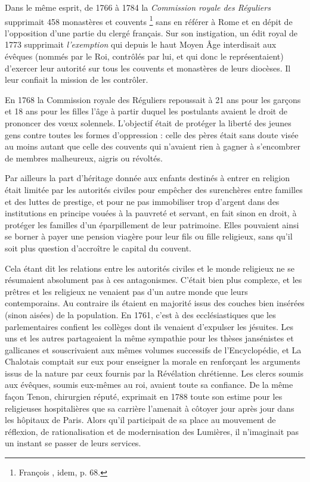  Dans le même esprit, de 1766 à 1784 la \emph{Commission royale des Réguliers} supprimait 458 monastères et couvents%
\footnote{François , idem, p. 68.} 
sans en référer à Rome et en dépit de l'opposition d'une partie du clergé français. Sur son instigation, un édit royal de 1773 supprimait \emph{l'exemption} qui depuis le haut Moyen Âge interdisait aux évêques (nommés par le Roi, contrôlés par lui, et qui donc le représentaient) d'exercer leur autorité sur tous les couvents et monastères de leurs diocèses. Il leur confiait la mission de les contrôler. 

 En 1768 la Commission royale des Réguliers repoussait à 21 ans pour les garçons et 18 ans pour les filles l'âge à partir duquel les postulants avaient le droit de prononcer des vœux solennels. L'objectif était de protéger la liberté des jeunes gens contre toutes les formes d'oppression : celle des pères était sans doute visée au moins autant que celle des couvents qui n'avaient rien à gagner à s'encombrer de membres malheureux, aigris ou révoltés.

 Par ailleurs la part d'héritage donnée aux enfants destinés à entrer en religion était limitée par les autorités civiles pour empêcher des surenchères entre familles et des luttes de prestige, et pour ne pas immobiliser trop d'argent dans des institutions en principe vouées à la pauvreté et servant, en fait sinon en droit, à protéger les familles d'un éparpillement de leur patrimoine. Elles pouvaient ainsi se borner à payer une pension viagère pour leur fils ou fille religieux, sans qu'il soit plus question d'accroître le capital du couvent.

 Cela étant dit les relations entre les autorités civiles et le monde religieux ne se résumaient absolument pas à ces antagonismes. C'était bien plus complexe, et les prêtres et les religieux ne venaient pas d'un autre monde que leurs contemporains. Au contraire ils étaient en majorité issus des couches bien insérées (sinon aisées) de la population. En 1761, c'est à des ecclésiastiques que les parlementaires confient les collèges dont ils venaient d'expulser les jésuites. Les uns et les autres partageaient la même sympathie pour les thèses jansénistes et gallicanes et souscrivaient aux mêmes volumes successifs de l'Encyclopédie, et La Chalotais comptait sur eux pour enseigner la morale en renforçant les arguments issus de la nature par ceux fournis par la Révélation chrétienne. Les clercs soumis aux évêques, soumis eux-mêmes au roi, avaient toute sa confiance. De la même façon Tenon, chirurgien réputé, exprimait en 1788 toute son estime pour les religieuses hospitalières que sa carrière l'amenait à côtoyer jour après jour dans les hôpitaux de Paris. Alors qu'il participait de sa place au mouvement de réflexion, de rationalisation et de modernisation des Lumières, il n'imaginait pas un instant se passer de leurs services. 


